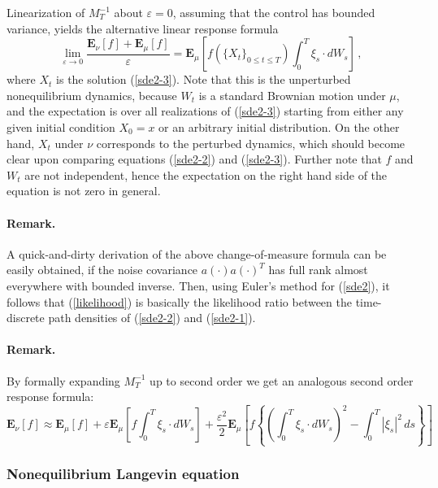 \documentclass[aip,jcp,a4paper,reprint,onecolumn]{revtex4-1}
\newcommand{\eps}{\varepsilon}
\newcommand{\bE}{{\mathbf E}}
\begin{document}
Linearization of $M_{T}^{-1}$ about $\eps=0$, assuming that the control has bounded variance, yields the alternative linear response formula 
\begin{equation}\label{lr-alt}
\lim_{\eps\to 0}\frac{\bE_{\nu}[f] + \bE_{\mu}[f]}{\eps} = \bE_{\mu}\left[f(\{X_{t}\}_{0\le t\le T})\int_{0}^{T}\xi_{s}\cdot dW_{s} \right]\,,
\end{equation}
where $X_{t}$ is the solution (\ref{sde2-3}). Note that this is the unperturbed nonequilibrium dynamics, because $W_{t}$ is a standard Brownian motion under $\mu$, and the expectation is over all realizations of (\ref{sde2-3}) starting from either any given initial condition $X_{0}=x$ or an arbitrary initial distribution. On the other hand, $X_{t}$ under $\nu$ corresponds to the perturbed dynamics, which should become clear upon comparing equations (\ref{sde2-2}) and (\ref{sde2-3}). Further note that $f$ and $W_{t}$ are not independent, hence the expectation on the right hand side of the equation is not zero in general. 


\paragraph*{Remark.} A quick-and-dirty derivation of the above change-of-measure formula can be easily obtained, if the noise covariance $a(\cdot)a(\cdot)^{T}$ has full rank almost everywhere with bounded inverse. Then, using Euler's method for (\ref{sde2}), it follows that (\ref{likelihood}) is basically the likelihood ratio between the time-discrete path densities of (\ref{sde2-2}) and (\ref{sde2-1}).    

\paragraph*{Remark.} By formally expanding $M^{-1}_T$ up to second order we get an analogous second order response formula: 
\begin{equation}\label{2nd}
\bE_{\nu}[f] \approx \bE_{\mu}[f] + \eps \bE_{\mu}\left[f\int_{0}^{T}\xi_{s}\cdot dW_{s} \right] +\frac{\eps^{2}}{2} \bE_{\mu}\left[f\left\{\left(\int_{0}^{T}\xi_{s}\cdot dW_{s}\right)^2 -\int_0^T |\xi_s|^2\,ds\right\} \right]
\end{equation}
 





\subsubsection*{Nonequilibrium Langevin equation}
\end{document}
